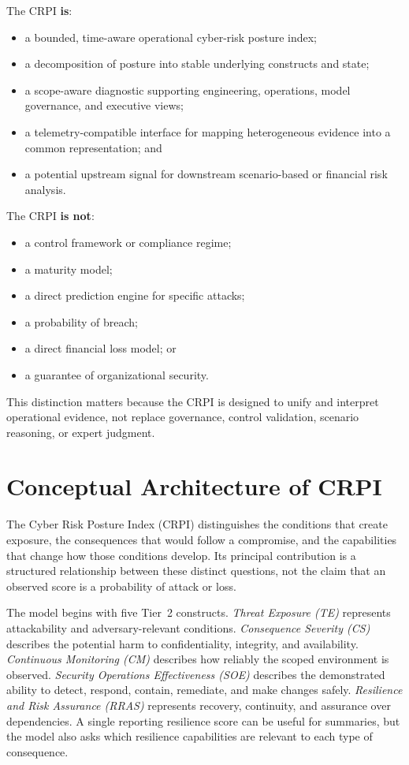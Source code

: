 \documentclass[11pt]{article}
\begin{document}
The CRPI \textbf{is}:
\begin{itemize}
  \item a bounded, time-aware operational cyber-risk posture index;
  \item a decomposition of posture into stable underlying constructs and state;
  \item a scope-aware diagnostic supporting engineering, operations, model governance,
    and executive views;
  \item a telemetry-compatible interface for mapping heterogeneous evidence into a
    common representation; and
  \item a potential upstream signal for downstream scenario-based or financial risk
    analysis.
\end{itemize}

The CRPI \textbf{is not}:
\begin{itemize}
  \item a control framework or compliance regime;
  \item a maturity model;
  \item a direct prediction engine for specific attacks;
  \item a probability of breach;
  \item a direct financial loss model; or
  \item a guarantee of organizational security.
\end{itemize}

This distinction matters because the CRPI is designed to unify and interpret operational
evidence, not replace governance, control validation, scenario reasoning, or expert
judgment.


\section{Conceptual Architecture of CRPI}
\label{sec:conceptual}
The Cyber Risk Posture Index (CRPI) distinguishes the conditions that create exposure,
the consequences that would follow a compromise, and the capabilities that change how
those conditions develop. Its principal contribution is a structured relationship
between these distinct questions, not the claim that an observed score is a probability
of attack or loss.

The model begins with five Tier~2 constructs. \emph{Threat Exposure (TE)} represents
attackability and adversary-relevant conditions. \emph{Consequence Severity (CS)}
describes the potential harm to confidentiality, integrity, and availability.
\emph{Continuous Monitoring (CM)} describes how reliably the scoped environment is
observed. \emph{Security Operations Effectiveness (SOE)} describes the demonstrated
ability to detect, respond, contain, remediate, and make changes safely.
\emph{Resilience and Risk Assurance (RRAS)} represents recovery, continuity, and
assurance over dependencies. A single reporting resilience score can be useful for
summaries, but the model also asks which resilience capabilities are relevant to each
type of consequence.
\end{document}
